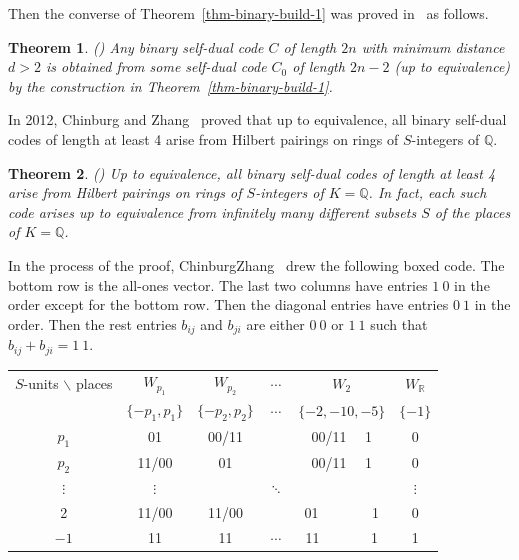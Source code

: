\documentclass[12pt]{article}
\newtheorem{theorem}{Theorem}[section]
\begin{document}
Then the converse of Theorem~\ref{thm-binary-build-1} was proved in~\cite{Kim2001} as follows.

\begin{theorem} (\cite[Theorem 2]{Kim2001})  \label{thm-binary-build-2}
 Any binary self-dual code $C$ of length $2n$ with minimum distance $d>2$ is obtained from some self-dual code $C_0$ of length
$2n-2$ (up to equivalence) by the construction in Theorem~\ref{thm-binary-build-1}.
\end{theorem}

In 2012, Chinburg and Zhang~\cite{ChinburgZhang} proved that up to equivalence, all binary self-dual codes of length at least 4 arise from Hilbert pairings on rings of $S$-integers of $\mathbb Q$.

\begin{theorem}(\cite[Theorem 1.5]{ChinburgZhang})  \label{thm-binary-hilbert-2}
Up to equivalence, all binary self-dual codes of length at least 4 arise from Hilbert pairings on rings of $S$-integers of $K= \mathbb Q$. In fact, each such code arises up to equivalence from infinitely many different subsets $S$ of the places of $K=\mathbb Q$.
\end{theorem}

In the process of the proof, ChinburgZhang~\cite{ChinburgZhang} drew the following boxed code. The bottom row is the all-ones vector. The last two columns have entries $1~0$ in the order except for the bottom row. Then the diagonal entries have entries $0~1$ in the order. Then the rest entries $b_{ij}$ and $b_{ji}$ are either $0~0$ or $1~1$ such that  $b_{ij} + b_{ji} = 1~1$.

\begin{center}
\begin{tabular}{|c|ccccc|}
\toprule
$S$-units $\backslash$  places & $W_{p_1}$  & $W_{p_2}$ & $\cdots$ & $W_2$  & $W_{\mathbb R}$ \\
 & $\{-p_1, p_1\}$ & $\{-p_2, p_2\}$ & $\cdots$  & $\{-2, -10, -5 \}$ & $\{-1 \}$  \\
\midrule
$p_1$  & 01   & 00/11  &  & 00/11 ~~1  &  0 \\
$p_2$  & 11/00   & 01  &  & 00/11 ~~1  &  0 \\
$\vdots$ & $\vdots$ &   &  $\ddots$ &   & $\vdots$ \\
2  & 11/00   & 11/00  &   & 01 ~~~~~~~1  &  0 \\
$-1$ & 11      & 11 & $\cdots$ & 11 ~~~~~~ 1 &  1 \\
\bottomrule
\end{tabular}
\end{center}
\end{document}
